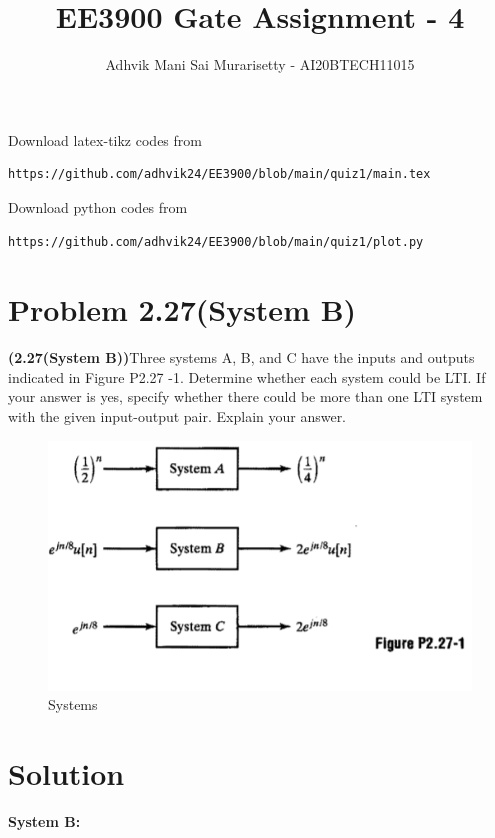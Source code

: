 \documentclass[journal,12pt,twocolumn]{IEEEtran}
\begin{document}
\vspace{3cm}
\title{EE3900 Gate Assignment - 4}
\author{Adhvik Mani Sai Murarisetty - AI20BTECH11015}
\maketitle
\newpage
\bigskip
\renewcommand{\thetable}{\theenumi}

Download latex-tikz codes from 
%
\begin{lstlisting}
https://github.com/adhvik24/EE3900/blob/main/quiz1/main.tex
\end{lstlisting}
%
Download python codes from 
%
\begin{lstlisting}
https://github.com/adhvik24/EE3900/blob/main/quiz1/plot.py
\end{lstlisting}
\section*{Problem 2.27(System B)}
\textbf{(2.27(System B))}Three systems A, B, and C have the inputs and outputs indicated in Figure P2.27 -1. Determine whether each system could be LTI. If your answer is yes, specify whether there could
be more than one LTI system with the given input-output pair. Explain your answer. 

\begin{figure}[!htp]
    \centering
    \includegraphics[width = \columnwidth]{q1.PNG}
    \caption{Systems}
    \label{f0}
\end{figure}

\section*{Solution}
\textbf{System B:}
\end{document}
